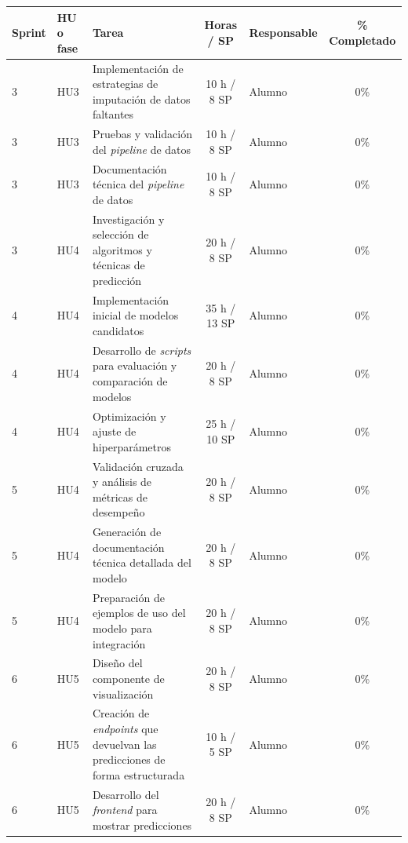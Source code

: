 \documentclass[
11pt, %
]{charter}
\begin{document}
\begin{table}[htpb]
\centering
\begin{tabularx}{\linewidth}{@{}|l|l|X|c|l|c|@{}}
\hline
\rowcolor[HTML]{C0C0C0}
Sprint & HU o fase & Tarea & Horas / SP & Responsable & \% Completado \\ \hline

3 & HU3 & Implementación de estrategias de imputación de datos faltantes & 10 h / 8 SP & Alumno & 0\% \\ \hline
3 & HU3 & Pruebas y validación del \textit{pipeline} de datos & 10 h / 8 SP & Alumno & 0\% \\ \hline
3 & HU3 & Documentación técnica del \textit{pipeline} de datos & 10 h / 8 SP & Alumno & 0\% \\ \hline

3 & HU4 & Investigación y selección de algoritmos y técnicas de predicción & 20 h / 8 SP & Alumno & 0\% \\ \hline
4 & HU4 & Implementación inicial de modelos candidatos & 35 h / 13 SP & Alumno & 0\% \\ \hline
4 & HU4 & Desarrollo de \textit{scripts} para evaluación y comparación de modelos & 20 h / 8 SP & Alumno & 0\% \\ \hline
4 & HU4 & Optimización y ajuste de hiperparámetros & 25 h / 10 SP & Alumno & 0\% \\ \hline
5 & HU4 & Validación cruzada y análisis de métricas de desempeño & 20 h / 8 SP & Alumno & 0\% \\ \hline
5 & HU4 & Generación de documentación técnica detallada del modelo & 20 h / 8 SP & Alumno & 0\% \\ \hline
5 & HU4 & Preparación de ejemplos de uso del modelo para integración & 20 h / 8 SP & Alumno & 0\% \\ \hline

6 & HU5 & Diseño del componente de visualización & 20 h / 8 SP & Alumno & 0\% \\ \hline
6 & HU5 & Creación de \textit{endpoints} que devuelvan las predicciones de forma estructurada & 10 h / 5 SP & Alumno & 0\% \\ \hline
6 & HU5 & Desarrollo del \textit{frontend} para mostrar predicciones & 20 h / 8 SP & Alumno & 0\% \\ \hline


\end{tabularx}
\end{table}
\end{document}
